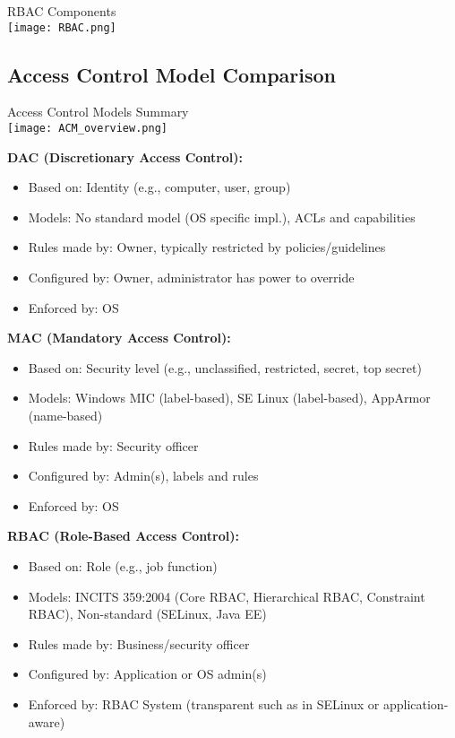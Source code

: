 \begin{concept}{RBAC Components}\\
    \texttt{[image: RBAC.png]}
\end{concept}

\subsection{Access Control Model Comparison}

\begin{theorem}{Access Control Models Summary}\\
    \texttt{[image: ACM\_overview.png]}
    
    \textbf{DAC (Discretionary Access Control):}
    \begin{itemize}
        \item Based on: Identity (e.g., computer, user, group)
        \item Models: No standard model (OS specific impl.), ACLs and capabilities
        \item Rules made by: Owner, typically restricted by policies/guidelines
        \item Configured by: Owner, administrator has power to override
        \item Enforced by: OS
    \end{itemize}
    
    \textbf{MAC (Mandatory Access Control):}
    \begin{itemize}
        \item Based on: Security level (e.g., unclassified, restricted, secret, top secret)
        \item Models: Windows MIC (label-based), SE Linux (label-based), AppArmor (name-based)
        \item Rules made by: Security officer
        \item Configured by: Admin(s), labels and rules
        \item Enforced by: OS
    \end{itemize}
    
    \textbf{RBAC (Role-Based Access Control):}
    \begin{itemize}
        \item Based on: Role (e.g., job function)
        \item Models: INCITS 359:2004 (Core RBAC, Hierarchical RBAC, Constraint RBAC), Non-standard (SELinux, Java EE)
        \item Rules made by: Business/security officer
        \item Configured by: Application or OS admin(s)
        \item Enforced by: RBAC System (transparent such as in SELinux or application-aware)
    \end{itemize}
\end{theorem}